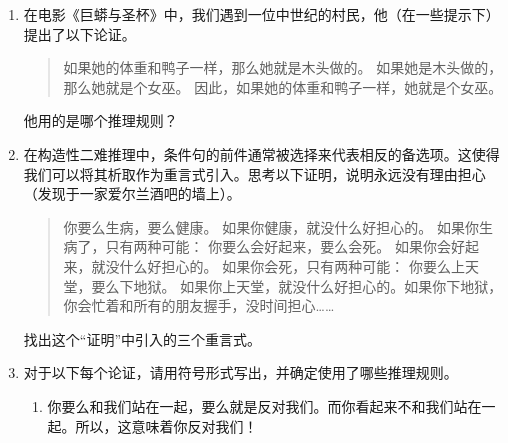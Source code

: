 \begin{enumerate}

    \item 
    
    在电影《巨蟒与圣杯》中，我们遇到一位中世纪的村民，他（在一些提示下）提出了以下论证。
    \begin{quote}
    如果她的体重和鸭子一样，那么她就是木头做的。\newline
    如果她是木头做的，那么她就是个女巫。\newline
    因此，如果她的体重和鸭子一样，她就是个女巫。
    \end{quote} 
    
    
    他用的是哪个推理规则？
    
    
    \item 
    
    在构造性二难推理中，条件句的前件通常被选择来代表相反的备选项。这使得我们可以将其析取作为重言式引入。思考以下证明，说明永远没有理由担心（发现于一家爱尔兰酒吧的墙上）。
    \begin{quote}
    你要么生病，要么健康。\newline
    如果你健康，就没什么好担心的。\newline
    如果你生病了，只有两种可能：\newline
    你要么会好起来，要么会死。\newline
    如果你会好起来，就没什么好担心的。\newline
    如果你会死，只有两种可能：\newline
    你要么上天堂，要么下地狱。\newline
    如果你上天堂，就没什么好担心的。如果你下地狱，你会忙着和所有的朋友握手，没时间担心……
    \end{quote}
    
    
    找出这个“证明”中引入的三个重言式。
    
    
    \textbookpagebreak
    
    \item 
    对于以下每个论证，请用符号形式写出，并确定使用了哪些推理规则。
    \begin{enumerate}
    \item \rule{0pt}{24pt}     
    你要么和我们站在一起，要么就是反对我们。而你看起来不和我们站在一起。所以，这意味着你反对我们！
    

\end{enumerate}
\end{enumerate}

